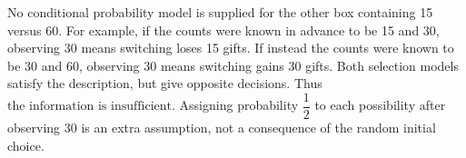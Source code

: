 No conditional probability model is supplied for the other box containing 15 versus 60. For example, if the counts were known in advance to be 15 and 30, observing 30 means switching loses 15 gifts. If instead the counts were known to be 30 and 60, observing 30 means switching gains 30 gifts. Both selection models satisfy the description, but give opposite decisions. Thus $\boxed{\text{the information is insufficient}}$. Assigning probability $\dfrac{1}{2}$ to each possibility after observing 30 is an extra assumption, not a consequence of the random initial choice.
